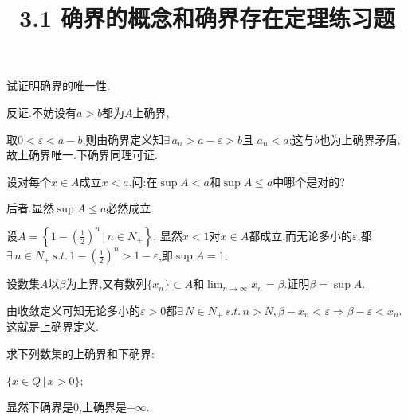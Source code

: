 \documentclass[windows,list,answers]{BHCexam}
\begin{document}
\everymath{\displaystyle}
\title{3.1 确界的概念和确界存在定理\quad 练习题}

\maketitle

\begin{questions}
    \question
    试证明确界的唯一性.
    \begin{solution}{1cm}
        \methodonly
        反证.不妨设有$a>b$都为$A$上确界,

        取$0<\varepsilon<a-b$,则由确界定义知$\exists\, a_n>a-\varepsilon>b$且
        $a_n<a$;这与$b$也为上确界矛盾,故上确界唯一.下确界同理可证.
    \end{solution}

    \question
    设对每个$x\in A$成立$x<a$.问:在$\sup A<a$和$\sup A\leqslant a$中哪个是对的?
    \begin{solution}{1cm}
        \methodonly
        后者.显然$\sup A\leqslant a$必然成立.

        设$A=\left\{1-(\frac{1}{2})^n\,\bigg\lvert\,n\in N_+\right\}$,
        显然$x<1$对$x\in A$都成立,而无论多小的$\varepsilon$,都$\exists
            \,n\in N_+\,s.t.\,1-(\frac{1}{2})^n>1-\varepsilon$,即$\sup A=1$.
    \end{solution}
    \question
    设数集$A$以$\beta$为上界,又有数列$\{x_n\}\subset A$和$\lim_{n\to\infty}x_n=\beta.$证明$\beta=\sup A$.
    \begin{solution}{1cm}
        \methodonly
        由收敛定义可知无论多小的$\varepsilon>0$都$\exists\,N\in N_+
            \,s.t.\,n>N,\beta-x_n<\varepsilon\Rightarrow\beta-\varepsilon<x_n$.
        这就是上确界定义.
    \end{solution}
    \question
    求下列数集的上确界和下确界:
    \begin{subquestions}
        \subquestion
        $\{x\in Q\,\lvert\, x>0\};$
        \begin{solution}{1cm}
            \methodonly
            显然下确界是0,上确界是$+\infty$.
        \end{solution}


\end{subquestions}
\end{questions}
\end{document}
